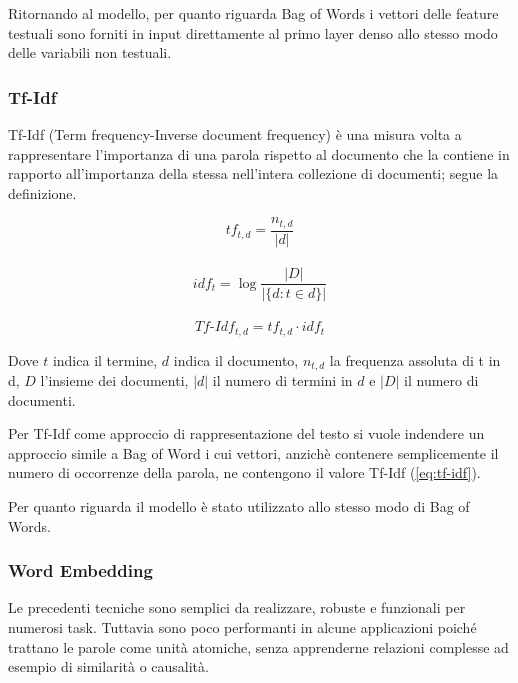 Ritornando al modello, per quanto riguarda Bag of Words i vettori delle feature
testuali sono forniti in input direttamente al primo layer denso allo stesso
modo delle variabili non testuali.

\subsubsection{Tf-Idf}\label{section-tfidf} Tf-Idf (Term frequency-Inverse
document frequency) \cite{manning_raghavan_schutze_2008} è una misura volta a
rappresentare l'importanza di una parola rispetto al documento che la contiene
in rapporto all'importanza della stessa nell'intera collezione di documenti;
segue la definizione.%

\begin{equation}
\label{eq:tf}
   tf_{t,d} = \frac{n_{t,d}}{|d|} 
\end{equation}
\\
\begin{equation}
\label{eq:idf}
   idf_{t} = \log \frac{|D|}{|\{d: t \in d\}|} 
\end{equation}
\\
\begin{equation}
\label{eq:tf-idf}
    Tf\mbox{-}Idf_{t,d} = tf_{t,d} \cdot idf_t
\end{equation}

Dove $t$ indica il termine, $d$
indica il documento, $n_{t,d}$ la frequenza assoluta di t in d, $D$ l'insieme
dei documenti, $|d|$ il numero di termini in $d$ e $|D|$ il numero di documenti.

Per Tf-Idf come approccio di rappresentazione del testo si vuole indendere un
approccio simile a Bag of Word i cui vettori, anzichè contenere semplicemente il
numero di occorrenze della parola, ne contengono il valore Tf-Idf
(\ref{eq:tf-idf}).

Per quanto riguarda il modello è stato utilizzato allo stesso modo di Bag
of Words. 



\subsubsection{Word Embedding}

Le precedenti tecniche sono semplici da realizzare, robuste e funzionali per
numerosi task. Tuttavia sono poco performanti in alcune applicazioni poiché
trattano le parole come unità atomiche, senza apprenderne relazioni complesse
ad esempio di similarità o causalità.

